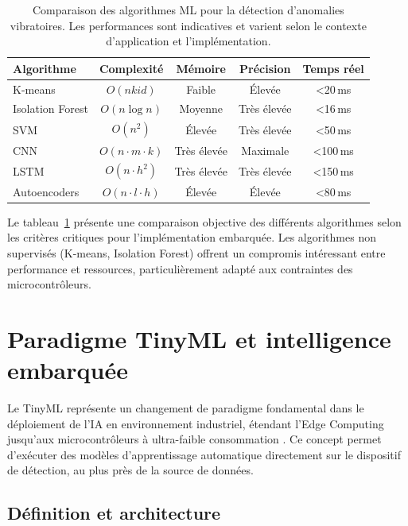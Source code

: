 \begin{table}[ht]
\centering
\caption{Comparaison des algorithmes ML pour la détection d'anomalies vibratoires. Les performances sont indicatives et varient selon le contexte d'application et l'implémentation.}
\label{tab:ml_comparison}
\small
\begin{tabular}{lcccc}
\toprule
\textbf{Algorithme} & \textbf{Complexité} & \textbf{Mémoire} & \textbf{Précision} & \textbf{Temps réel} \\
\midrule
K-means & $O(nkid)$ & Faible & Élevée & <20\,ms \\
Isolation Forest & $O(n\log n)$ & Moyenne & Très élevée & <16\,ms\cite{antonini2023} \\
SVM & $O(n^2)$ & Élevée & Très élevée & <50\,ms \\
CNN & $O(n \cdot m \cdot k)$ & Très élevée & Maximale & <100\,ms\cite{langer2025} \\
LSTM & $O(n \cdot h^2)$ & Très élevée & Très élevée & <150\,ms \\
Autoencoders & $O(n \cdot l \cdot h)$ & Élevée & Élevée & <80\,ms \\
\bottomrule
\end{tabular}
\end{table}

Le tableau~\ref{tab:ml_comparison} présente une comparaison objective des différents algorithmes selon les critères critiques pour l'implémentation embarquée. Les algorithmes non supervisés (K-means, Isolation Forest) offrent un compromis intéressant entre performance et ressources, particulièrement adapté aux contraintes des microcontrôleurs.

\section{Paradigme TinyML et intelligence embarquée}

Le TinyML représente un changement de paradigme fondamental dans le déploiement de l'IA en environnement industriel, étendant l'Edge Computing jusqu'aux microcontrôleurs à ultra-faible consommation \cite{tsoukas2024,njor2024}. Ce concept permet d'exécuter des modèles d'apprentissage automatique directement sur le dispositif de détection, au plus près de la source de données.

\subsection{Définition et architecture}

